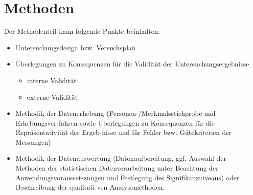 \chapter{Methoden}
Der Methodenteil kann folgende Punkte beinhalten:
\begin{itemize}
	\item Untersuchungsdesign bzw. Versuchsplan
	\item Überlegungen zu Konsequenzen für die Validität der Untersuchungsergebnisse
	\begin{itemize}
		\item interne Validität
		\item externe Validität
	\end{itemize}
	\item Methodik der Datenerhebung (Personen-/Merkmalsstichprobe und Erhebungsver-fahren sowie Überlegungen zu Konsequenzen für die Repräsentativität der Ergeb-nisse und für Fehler bzw. Gütekriterien der Messungen)
	\item Methodik der Datenauswertung (Datenaufbereitung, ggf. Auswahl der Methoden der statistischen Datenverarbeitung unter Beachtung der Anwendungsvorausset-zungen und Festlegung des Signifikanzniveaus) oder Beschreibung der qualitati-ven Analysemethoden.
\end{itemize}
